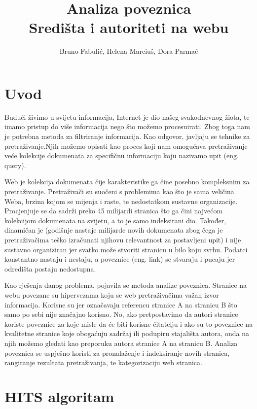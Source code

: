 \documentclass[11pt]{article}
\title{%
  Analiza poveznica \\ 
  \large Središta i autoriteti na webu }
\author{Bruno Fabuli\'{c}, Helena Marciu\v{s}, Dora Parma\v{c}}
\begin{document}
	\maketitle
	\newpage
	\hypersetup{linkcolor=black}
	\tableofcontents
\newpage
\hypersetup{linkcolor=red}

\section{Uvod}
Budući živimo u svijetu informacija, Internet je dio našeg svakodnevnog žiota, te imamo pristup do više informacija nego što možemo procesuirati. Zbog toga nam je potrebna metoda za filtriranje informacija.
Kao odgovor, javljaju se tehnike za pretraživanje.Njih možemo opisati kao proces koji nam omogućava pretraživanje veće kolekcije dokumenata za specifičnu informaciju koju nazivamo upit (eng. query).

Web je kolekcija dokumenata čije karakteristike ga čine posebno kompleksnim za pretraživanje. Pretraživači su suočeni s problemima kao što je sama veličina Weba, brzina kojom se mijenja i raste, te nedostatkom sustavne organizacije. Procjenjuje se da sadrži preko 45 milijardi stranica što ga čini najvećom kolekcijom dokumenata na svijetu, a to je samo indeksirani dio. Također, dinamičan je (godišnje nastaje milijarde novih dokumenata zbog čega je pretraživačima teško izračunati njihovu relevantnost za postavljeni upit) i nije sustavno organiziran jer svatko može stvoriti stranicu u bilo koju svrhu. Podatci konstantno nastaju i nestaju, a poveznice (eng. link) se stvaraju i pucaju jer odredišta postaju nedostupna.

Kao rješenja danog problema, pojavila se metoda analize poveznica.
Stranice na webu povezane su hipervezama koju se web pretraživačima važan izvor informacija. Korisne su jer označavaju referencu stranice A na stranicu B što samo po sebi nije značajno korisno. No, ako pretpostavimo da autori stranice koriste poveznice za koje misle da će biti korisne čitatelju i ako su to poveznice na kvalitetne stranice koje obogaćuju sadržaj ili podupiru stajališta autora, onda na njih možemo gledati kao preporuku autora stranice A na stranicu B.
Analiza poveznica se uspješno koristi za pronalaženje i indeksiranje novih stranica, rangiranje rezultata pretraživanja, te kategorizaciju web stranica.

\newpage

\section{HITS algoritam}
\end{document}
